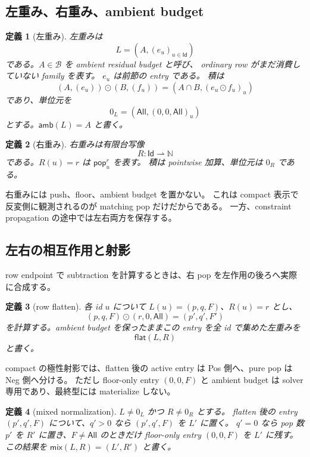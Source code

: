 \documentclass[uplatex,dvipdfmx,a4paper,10.5pt]{jsarticle}
\theoremstyle{jpplain}
\newtheorem{definition}{定義}[section]
\newcommand{\Id}{\mathsf{Id}}
\newcommand{\Nat}{\mathbb N}
\newcommand{\All}{\mathsf{All}}
\newcommand{\mix}{\mathsf{mix}}
\newcommand{\popop}[1]{\mathsf{pop}_{#1}}
\newcommand{\Caps}{\mathcal B}
\newcommand{\amb}{\mathsf{amb}}
\begin{document}
\subsection{左重み、右重み、ambient budget}

\begin{definition}[左重み]
左重みは
\[
  L=(A,(e_u)_{u\in\Id})
\]
である。$A\in\Caps$ を ambient residual budget と呼び、
ordinary row がまだ消費していない family を表す。
$e_u$ は前節の entry である。
積は
\[
 (A,(e_u))\odot(B,(f_u))
 = (A\cap B,(e_u\odot f_u)_u)
\]
であり、単位元を
\[
 0_L=(\All,(0,0,\All)_u)
\]
とする。$\amb(L)=A$ と書く。
\end{definition}

\begin{definition}[右重み]
右重みは有限台写像
\[
  R:\Id\rightharpoonup\Nat
\]
である。$R(u)=r$ は $\popop{u}^{r}$ を表す。
積は pointwise 加算、単位元は $0_R$ である。
\end{definition}

右重みには push、floor、ambient budget を置かない。
これは compact 表示で反変側に観測されるのが matching pop だけだからである。
一方、constraint propagation の途中では左右両方を保存する。

\subsection{左右の相互作用と射影}

row endpoint で subtraction を計算するときは、右 pop を左作用の後ろへ実際に合成する。

\begin{definition}[row flatten]
各 id $u$ について $L(u)=(p,q,F)$、$R(u)=r$ とし、
\[
  (p,q,F)\odot(r,0,\All)=(p',q',F')
\]
を計算する。ambient budget を保ったままこの entry を全 id で集めた左重みを
\[
  \mathsf{flat}(L,R)
\]
と書く。
\end{definition}

compact の極性射影では、flatten 後の active entry は Pos 側へ、pure pop は Neg 側へ分ける。
ただし floor-only entry $(0,0,F)$ と ambient budget は solver 専用であり、最終型には materialize しない。

\begin{definition}[mixed normalization]
$L\neq0_L$ かつ $R\neq0_R$ とする。
flatten 後の entry $(p',q',F)$ について、$q'>0$ なら $(p',q',F)$ を $L'$ に置く。
$q'=0$ なら pop 数 $p'$ を $R'$ に置き、$F\neq\All$ のときだけ floor-only entry $(0,0,F)$ を $L'$ に残す。
この結果を $\mix(L,R)=(L',R')$ と書く。
\end{definition}
\end{document}
